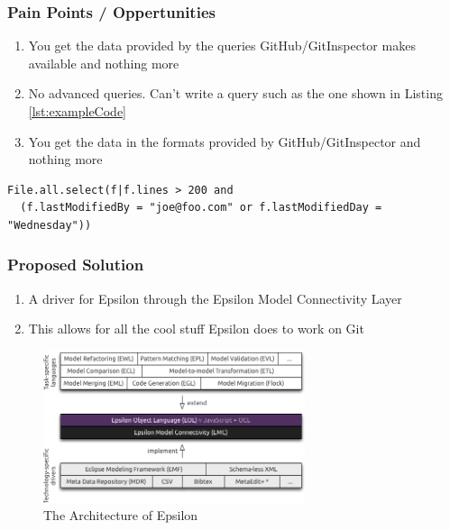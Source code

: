 \documentclass[aspectratio=1610]{beamer}
\begin{document}
\begin{frame}[containsverbatim]
\frametitle{Pain Points / Oppertunities}
\begin{enumerate}
	\item You get the data provided by the queries GitHub/GitInspector makes available and nothing more
	\item No advanced queries. Can't write a query such as the one shown in Listing \ref{lst:exampleCode}
	\item You get the data in the formats provided by GitHub/GitInspector and nothing more
\end{enumerate}

\begin{lstlisting}[caption=An advanced Git query in EOL, label=lst:exampleCode]
File.all.select(f|f.lines > 200 and 
  (f.lastModifiedBy = "joe@foo.com" or f.lastModifiedDay = "Wednesday"))
  \end{lstlisting}
\end{frame}

\begin{frame}
\frametitle{Proposed Solution}
\begin{enumerate}
	\item A driver for Epsilon through the Epsilon Model Connectivity Layer
	\item This allows for all the cool stuff Epsilon does to work on Git
\end{enumerate}
\begin{figure}[H]
	\centering
	\includegraphics[width=290px]{images/epsilon-architecture}
	\caption{The Architecture of Epsilon}
\end{figure} 
\end{frame}
\end{document}
